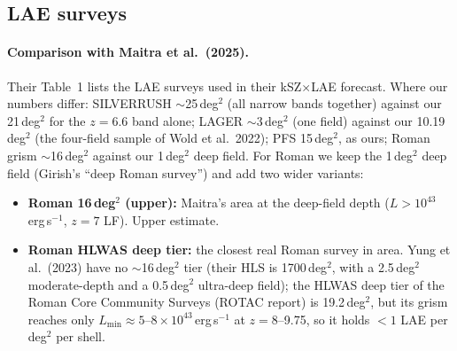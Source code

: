 \documentclass[11pt]{article}
\begin{document}
\subsection{LAE surveys}
\begin{table}[H]\centering\small
\resizebox{\textwidth}{!}{}
\caption{LAE survey shells. $L_{\min}$: SILVERRUSH from Weinberger, Kulkarni \& Haehnelt (2020) Table~1; LAGER from the faintest LAEs of Wold et al.\ (2022); Roman from the line-flux limits of Wold et al.\ (2023), who recover $L>10^{43}$\,erg\,s$^{-1}$ at 50\% completeness at $z=7.5$--10.5; PFS is an assumption. LFs: Umeda et al.\ (2025) Table~3 Schechter fits; LAGER four-field fit of Wold et al.\ (2022) with $\alpha=-2.5$. Observed counts: SILVERRUSH homogeneous samples of Ouchi et al.\ (2018), 959 LAEs in 13.8\,deg$^2$ ($z=5.7$) and 873 in 21.2\,deg$^2$ ($z=6.6$); LAGER 174 candidates in 10.19\,deg$^2$ (Wold et al.\ 2022). Areas: SILVERRUSH 14/21\,deg$^2$ (Konno et al.\ 2018); LAGER 3.24+2.91+1.90+2.14\,deg$^2$ (WIDE12, GAMA15A, COSMOS, CDFS; Wold et al.\ 2022); Roman deep field 1\,deg$^2$ (Wold et al.\ 2023). Roman 16\,deg$^2$: the area of Maitra et al.\ (2025) Table~1 at the deep-field depth (upper estimate). Roman HLWAS deep tier: 19.2\,deg$^2$ (ROTAC report, 2025), grism limit $\sim6\times10^{-17}$\,erg\,s$^{-1}$\,cm$^{-2}$ (our derivation from the report: 2.5$\times$ deeper than the medium tier's $1.5\times10^{-16}$), $L_{\min}=4\pi d_L^2F$ at the shell centres. Roman: two LF choices bracket the density, no evolution from $z=7$ (optimistic) and the $z=7.3$ LF (the observed decline). $b_{\rm ST}$: abundance-matched bias at the shell redshift.}
\label{tab:lae}
\end{table}

\paragraph{Comparison with Maitra et al.\ (2025).} Their Table~1 lists the LAE surveys used in their kSZ$\times$LAE forecast. Where our numbers differ: SILVERRUSH $\sim$25\,deg$^2$ (all narrow bands together) against our 21\,deg$^2$ for the $z=6.6$ band alone; LAGER $\sim$3\,deg$^2$ (one field) against our 10.19\,deg$^2$ (the four-field sample of Wold et al.\ 2022); PFS 15\,deg$^2$, as ours; Roman grism $\sim$16\,deg$^2$ against our 1\,deg$^2$ deep field. For Roman we keep the 1\,deg$^2$ deep field (Girish's ``deep Roman survey'') and add two wider variants:
\begin{itemize}
\item \textbf{Roman 16\,deg$^2$ (upper):} Maitra's area at the deep-field depth ($L>10^{43}$\,erg\,s$^{-1}$, $z=7$ LF). Upper estimate.
\item \textbf{Roman HLWAS deep tier:} the closest real Roman survey in area. Yung et al.\ (2023) have no $\sim$16\,deg$^2$ tier (their HLS is 1700\,deg$^2$, with a 2.5\,deg$^2$ moderate-depth and a 0.5\,deg$^2$ ultra-deep field); the HLWAS deep tier of the Roman Core Community Surveys (ROTAC report) is 19.2\,deg$^2$, but its grism reaches only $L_{\min}\approx5$--$8\times10^{43}$\,erg\,s$^{-1}$ at $z=8$--9.75, so it holds $<1$ LAE per deg$^2$ per shell.
\end{itemize}
\end{document}
